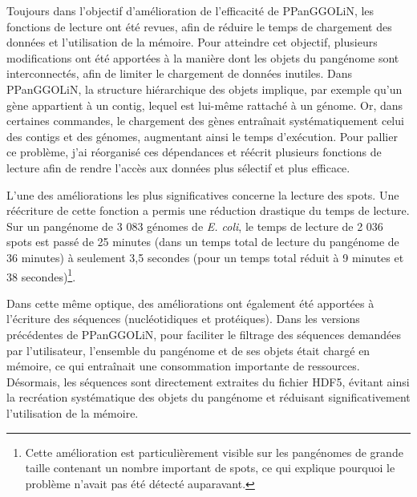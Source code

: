 Toujours dans l'objectif d'amélioration de l’efficacité de PPanGGOLiN, les fonctions de lecture ont été revues, afin de réduire le temps de chargement des données et l’utilisation de la mémoire. 
Pour atteindre cet objectif, plusieurs modifications ont été apportées à la manière dont les objets du pangénome sont interconnectés, afin de limiter le chargement de données inutiles. Dans PPanGGOLiN, la structure hiérarchique des objets implique, par exemple qu’un gène appartient à un contig, lequel est lui-même rattaché à un génome. Or, dans certaines commandes, le chargement des gènes entraînait systématiquement celui des contigs et des génomes, augmentant ainsi le temps d’exécution. Pour pallier ce problème, j'ai réorganisé ces dépendances et réécrit plusieurs fonctions de lecture afin de rendre l’accès aux données plus sélectif et plus efficace.

L’une des améliorations les plus significatives concerne la lecture des spots. Une réécriture de cette fonction a permis une réduction drastique du temps de lecture. Sur un pangénome de 3 083 génomes de \textit{E. coli}, le temps de lecture de 2 036 spots est passé de 25 minutes (dans un temps total de lecture du pangénome de 36 minutes) à seulement 3,5 secondes (pour un temps total réduit à 9 minutes et 38 secondes)\footnote{Cette amélioration est particulièrement visible sur les pangénomes de grande taille contenant un nombre important de spots, ce qui explique pourquoi le problème n’avait pas été détecté auparavant.}.

Dans cette même optique, des améliorations ont également été apportées à l’écriture des séquences (nucléotidiques et protéiques). Dans les versions précédentes de PPanGGOLiN, pour faciliter le filtrage des séquences demandées par l’utilisateur, l’ensemble du pangénome et de ses objets était chargé en mémoire, ce qui entraînait une consommation importante de ressources. Désormais, les séquences sont directement extraites du fichier HDF5, évitant ainsi la recréation systématique des objets du pangénome et réduisant significativement l’utilisation de la mémoire.

